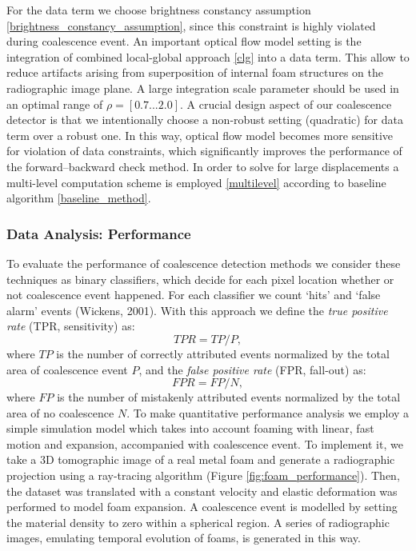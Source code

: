 For the data term we choose brightness constancy assumption \ref{brightness_constancy_assumption}, since this constraint is highly violated during coalescence event. An important optical flow model setting is the integration of combined local-global approach \ref{clg} into a data term. This allow to reduce artifacts arising from superposition of internal foam structures on the radiographic image plane. A large integration scale parameter should be used in an optimal range of $\rho = [0.7 ... 2.0]$.
A crucial design aspect of our coalescence detector is that we intentionally choose
a non-robust setting (quadratic) for data term over a robust one. In this way, optical flow model becomes more sensitive for violation of data constraints, which  significantly improves the performance of the forward–backward check method. 
In order to solve for large displacements a multi-level computation scheme is
employed \ref{multilevel} according to baseline algorithm \ref{baseline_method}.





\subsubsection{Data Analysis: Performance}
\label{app_foams_performance}

To evaluate the performance of coalescence detection methods we consider these techniques as binary classifiers, which decide for each pixel location 
whether or not coalescence event happened. For each classifier we count ‘hits’ and ‘false alarm’ events (Wickens, 2001). With this approach we define the \textit{true positive rate} (TPR, sensitivity) as:
$$TPR = TP / P,$$
where $TP$ is the number of correctly attributed events normalized by the total area of coalescence event $P$, and the \textit{false positive rate} (FPR, fall-out) as:
$$FPR = FP / N,$$
where $FP$ is the number of mistakenly attributed events normalized by the total area of no coalescence $N$. 
To make quantitative performance analysis we employ a simple simulation model which takes into account
foaming with linear, fast motion and expansion, accompanied
with coalescence event. To implement it, we take a 3D tomographic image of a real metal foam and generate a radiographic projection using a ray-tracing algorithm (Figure \ref{fig:foam_performance}). Then, the dataset was translated with a constant velocity and elastic deformation was performed to model foam expansion. A coalescence event is modelled by setting the material density to zero within a
spherical region. A series of radiographic images, emulating temporal evolution of foams, is generated in this way. 

